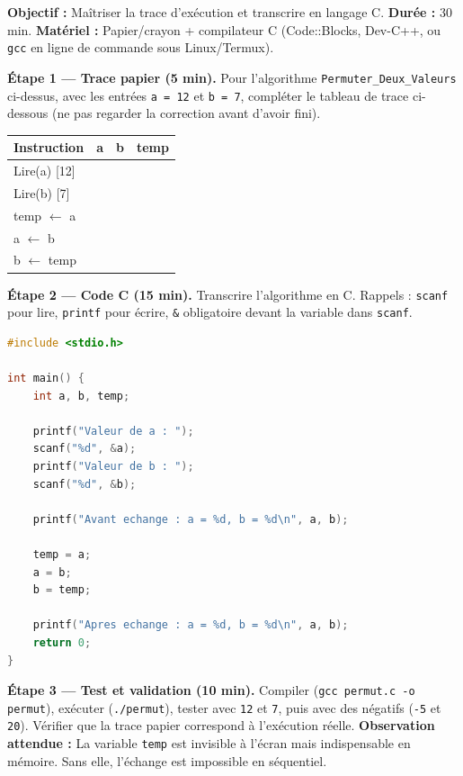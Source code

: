 \documentclass[11pt]{article}
\begin{document}
\begin{experience}
\textbf{Objectif :} Maîtriser la trace d'exécution et transcrire en langage C.
\textbf{Durée :} 30 min.
\textbf{Matériel :} Papier/crayon + compilateur C (Code::Blocks, Dev-C++, ou \texttt{gcc} en ligne de commande sous Linux/Termux).

\textbf{Étape 1 — Trace papier (5 min).}
Pour l'algorithme \texttt{Permuter\_Deux\_Valeurs} ci-dessus, avec les entrées \texttt{a = 12} et \texttt{b = 7}, compléter le tableau de trace ci-dessous (ne pas regarder la correction avant d'avoir fini).

\begin{center}
\begin{tabularx}{\linewidth}{|l|X|X|X|}\hline
\rowcolor{popblue}\textbf{Instruction} & \textbf{a} & \textbf{b} & \textbf{temp} \\\hline
Lire(a) [12] & & & \\\hline
Lire(b) [7] & & & \\\hline
temp $\leftarrow$ a & & & \\\hline
a $\leftarrow$ b & & & \\\hline
b $\leftarrow$ temp & & & \\\hline
\end{tabularx}
\end{center}

\textbf{Étape 2 — Code C (15 min).}
Transcrire l'algorithme en C. Rappels : \texttt{scanf} pour lire, \texttt{printf} pour écrire, \texttt{\&} obligatoire devant la variable dans \texttt{scanf}.
\begin{lstlisting}[language=C]
#include <stdio.h>

int main() {
    int a, b, temp;
    
    printf("Valeur de a : ");
    scanf("%d", &a);
    printf("Valeur de b : ");
    scanf("%d", &b);
    
    printf("Avant echange : a = %d, b = %d\n", a, b);
    
    temp = a;
    a = b;
    b = temp;
    
    printf("Apres echange : a = %d, b = %d\n", a, b);
    return 0;
}
\end{lstlisting}

\textbf{Étape 3 — Test et validation (10 min).}
Compiler (\texttt{gcc permut.c -o permut}), exécuter (\texttt{./permut}), tester avec \texttt{12} et \texttt{7}, puis avec des négatifs (\texttt{-5} et \texttt{20}). Vérifier que la trace papier correspond à l'exécution réelle.
\textbf{Observation attendue :} La variable \texttt{temp} est invisible à l'écran mais indispensable en mémoire. Sans elle, l'échange est impossible en séquentiel.
\end{experience}
\end{document}
